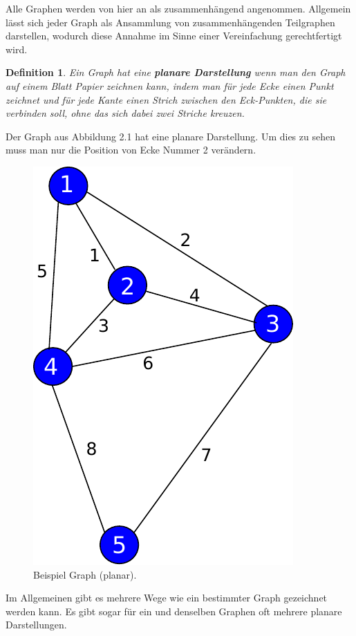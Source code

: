 \documentclass[11pt,a4paper,leqno]{report}
\newtheorem{definition}[theorem]{Definition}
\numberwithin{equation}{chapter}
\begin{document}
\noindent
Alle Graphen werden von hier an als zusammenh\"angend angenommen. Allgemein l\"asst sich jeder Graph als Ansammlung von zusammenh\"angenden Teilgraphen darstellen, wodurch diese Annahme im Sinne einer Vereinfachung gerechtfertigt wird.
\begin{definition}
	Ein Graph hat eine \textbf{planare Darstellung} wenn man den Graph auf einem Blatt Papier zeichnen kann, indem man f\"ur jede Ecke einen Punkt zeichnet und f\"ur jede Kante einen Strich zwischen den Eck-Punkten, die sie verbinden soll, ohne das sich dabei zwei Striche kreuzen.
\end{definition}
\noindent
	Der Graph aus Abbildung 2.1 hat eine planare Darstellung. Um dies zu sehen muss man nur die Position von Ecke Nummer 2 ver\"andern.
\begin{figure}[H]
	\begin{center}
		\includegraphics[scale=0.4]{Abbildungen/graph_1_planar.pdf}
		\caption{Beispiel Graph (planar).}
	\end{center}
\end{figure}
\noindent
	Im Allgemeinen gibt es mehrere Wege wie ein bestimmter Graph gezeichnet werden kann. Es gibt sogar f\"ur ein und denselben Graphen oft mehrere planare Darstellungen.
\end{document}
